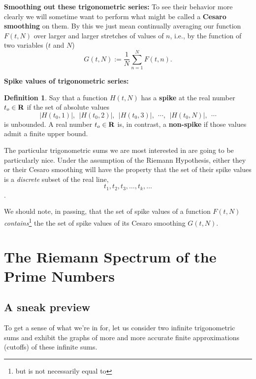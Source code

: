 \documentclass[openany]{book}
\theoremstyle{plain}
\theoremstyle{definition}
\newtheorem{definition}[theorem]{Definition}
\begin{document}
\vskip20pt {\bf Smoothing out these trigonometric series:} To see
their behavior more clearly we will sometime want to perform what
might be called a {\bf Cesaro smoothing} on them. By this we just mean
continually averaging our function $F(t,N)$ over larger and larger
stretches of values of $n$, i.e., by the function of two variables
($t$ and $N$) $$G(t,N):={\frac{1}{N}}\sum_{n=1}^NF(t,n).$$
   
   
{\bf Spike values of trigonometric series:} \begin{definition} Say
  that a function $H(t,N)$ has a {\bf spike} at the real number $t_o
  \in {\bf R}$ if the set of absolute values $$|H(t_0,1)|, \ \
  |H(t_0,2)|,\ \ |H(t_0,3)|,\ \ \cdots,\ \ |H(t_0,N)|,\ \ \cdots$$ is
  unbounded.  A real number $t_o \in {\bf R}$ is, in contrast, a {\bf
    non-spike} if those values admit a finite upper
  bound. \end{definition}

  \vskip10pt

  The particular trigonometric sums we are most interested in are
  going to be particularly nice. Under the assumption of the Riemann
  Hypothesis, either they or their Cesaro smoothing will have the
  property that the set of their spike values is a {\it discrete}
  subset of the real line, $$t_1, t_2, t_3, \dots, t_k, \dots$$.
 
\vskip10pt

We should note, in passing, that the set of spike values of a function
$F(t,N)$ {\it contains}{\footnote{but is not necessarily equal to}}
the the set of spike values of its Cesaro smoothing $G(t,N)$.



\part{The Riemann Spectrum of the Prime Numbers\label{part3}}

\chapter{ A sneak preview}\label{snpr}

To get a sense of what we're in for, let us consider two
infinite trigonometric sums and exhibit the graphs of more and more
accurate finite approximations (cutoffs) of these infinite sums.
\end{document}
